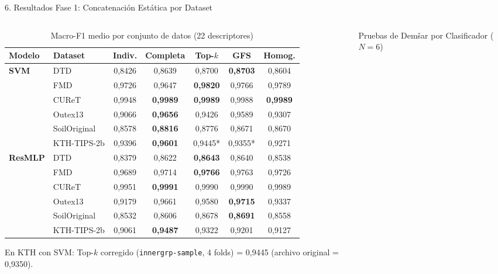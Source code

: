 \documentclass[aspectratio=169,10pt]{beamer}
\begin{document}
\begin{frame}{6. Resultados Fase 1: Concatenación Estática por Dataset}
\begin{columns}[T]
\begin{column}{0.56\textwidth}
\begin{table}
\centering
\scriptsize
\caption{Macro-F1 medio por conjunto de datos (22 descriptores)}
\begin{tabular}{@{}llccccc@{}}
\toprule
Modelo & Dataset & Indiv. & Completa & Top-$k$ & GFS & Homog. \\
\midrule
\textbf{SVM} & DTD & 0,8426 & 0,8639 & 0,8700 & \textbf{0,8703} & 0,8604 \\
 & FMD & 0,9726 & 0,9647 & \textbf{0,9820} & 0,9766 & 0,9789 \\
 & CUReT & 0,9948 & \textbf{0,9989} & \textbf{0,9989} & 0,9988 & \textbf{0,9989} \\
 & Outex13 & 0,9066 & \textbf{0,9656} & 0,9426 & 0,9589 & 0,9307 \\
 & SoilOriginal & 0,8578 & \textbf{0,8816} & 0,8776 & 0,8671 & 0,8670 \\
 & KTH-TIPS-2b & 0,9396 & \textbf{0,9601} & 0,9445* & 0,9355* & 0,9271 \\
\midrule
\textbf{ResMLP} & DTD & 0,8379 & 0,8622 & \textbf{0,8643} & 0,8640 & 0,8538 \\
 & FMD & 0,9689 & 0,9714 & \textbf{0,9766} & 0,9763 & 0,9726 \\
 & CUReT & 0,9951 & \textbf{0,9991} & 0,9990 & 0,9990 & 0,9989 \\
 & Outex13 & 0,9179 & 0,9661 & 0,9580 & \textbf{0,9715} & 0,9337 \\
 & SoilOriginal & 0,8532 & 0,8606 & 0,8678 & \textbf{0,8691} & 0,8558 \\
 & KTH-TIPS-2b & 0,9061 & \textbf{0,9487} & 0,9322 & 0,9201 & 0,9127 \\
\bottomrule
\end{tabular}
\end{table}
{\tiny *En KTH con SVM: Top-$k$ corregido (\texttt{innergrp-sample}, 4 folds) = 0,9445 (archivo original = 0,9350).}
\end{column}
\begin{column}{0.42\textwidth}
\begin{block}{\scriptsize Pruebas de Demšar por Clasificador ($N=6$)}
\scriptsize
\begin{itemize}

\end{itemize}
\end{block}
\end{column}
\end{columns}
\end{frame}
\end{document}
